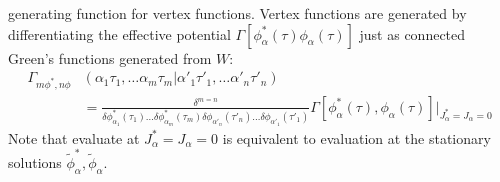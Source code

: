 \documentclass[12pt]{article}
\begin{document}
generating function for vertex functions. Vertex functions are generated by 
differentiating the effective potential $\Gamma[\phi^*_\alpha(\tau)\phi
_\alpha(\tau)]$ just as connected Green's functions generated from $W$:
\begin{equation*}
    \begin{split}
        \Gamma_{m\phi^*,n\phi}&(\alpha_1\tau_1,\dots\alpha_m\tau_m|\alpha'_1
        \tau'_1,\dots\alpha'_n\tau'_n)\\
        &=\frac{\delta^{m=n}}{\delta\phi^*_{\alpha_1}(\tau_1)\dots\delta\phi^*
        _{\alpha_m}(\tau_m)\delta\phi_{\alpha'_n}(\tau'_n)\dots\delta\phi_
        {\alpha'_1}(\tau'_1)}\Gamma[\phi^*_\alpha(\tau),\phi_\alpha(\tau)]
        \Bigg|_{J^*_\alpha=J_\alpha=0}
    \end{split}
\end{equation*}
Note that evaluate at $J^*_\alpha=J_\alpha=0$ is equivalent to evaluation at 
the stationary solutions ${\tilde{\phi}^*_\alpha,\tilde{\phi}_\alpha}$.
\end{document}
